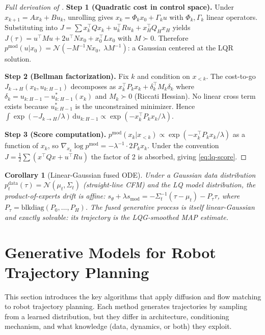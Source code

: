 \documentclass[11pt,letterpaper]{article}
\theoremstyle{plain}
\newtheorem{corollary}[theorem]{Corollary}
\theoremstyle{definition}
\theoremstyle{remark}
\newcommand{\dd}{\mathrm{d}}
\newcommand{\calN}{\mathcal{N}}
\newcommand{\grad}{\nabla}
\newcommand{\smodel}{s_{\mathrm{mod}}}
\begin{document}
\begin{advancedmath}
\begin{proof}[Full derivation of ]
\textbf{Step 1 (Quadratic cost in control space).}
Under $x_{k+1}=Ax_k+Bu_k$, unrolling gives $x_k=\Phi_kx_0+\Gamma_ku$
with $\Phi_k,\Gamma_k$ linear operators. Substituting into
$J=\sum x_k^\top Qx_k+u_k^\top Ru_k+x_H^\top Q_Hx_H$ yields
$J(\tau)=u^\top Mu+2u^\top Nx_0+x_0^\top Lx_0$ with
$M\succ 0$. Therefore
$p^{\mathrm{mod}}(u|x_0)=\calN(-M^{-1}Nx_0,\;\lambda M^{-1})$:
a Gaussian centered at the LQR solution.

\textbf{Step 2 (Bellman factorization).}
Fix $k$ and condition on $x_{<k}$. The cost-to-go
$J_{k\to H}(x_k,u_{k:H-1})$ decomposes as
$x_k^\top P_kx_k+\delta_k^\top M_k\delta_k$
where $\delta_k=u_{k:H-1}-u^*_{k:H-1}(x_k)$ and $M_k\succ 0$
(Riccati Hessian). No linear cross term exists because
$u^*_{k:H-1}$ is the unconstrained minimizer. Hence
$\int\exp(-J_{k\to H}/\lambda)\,\dd u_{k:H-1}
\propto\exp(-x_k^\top P_kx_k/\lambda)$.

\textbf{Step 3 (Score computation).}
$p^{\mathrm{mod}}(x_k|x_{<k})\propto\exp(-x_k^\top P_kx_k/\lambda)$
as a function of $x_k$, so
$\grad_{x_k}\log p^{\mathrm{mod}}=-\lambda^{-1}\cdot 2P_kx_k$.
Under the convention $J=\tfrac12\sum(x^\top Qx+u^\top Ru)$ the
factor of 2 is absorbed, giving \eqref{eq:lq-score}.
\end{proof}

\begin{corollary}[Linear-Gaussian fused ODE]
Under a Gaussian data distribution
$p_t^{\mathrm{data}}(\tau)=\calN(\mu_t,\Sigma_t)$ (straight-line CFM)
and the LQ model distribution, the product-of-experts drift is affine:
$s_\theta+\lambda\smodel=-\Sigma_t^{-1}(\tau-\mu_t)-P_\tau\tau$,
where $P_\tau=\mathrm{blkdiag}(P_0,\ldots,P_H)$.
The fused generative process is itself linear-Gaussian and exactly
solvable: its trajectory is the LQG-smoothed MAP estimate.
\end{corollary}
\end{advancedmath}

\section{Generative Models for Robot Trajectory Planning}\label{sec:robotplan}

This section introduces the key algorithms that apply diffusion and
flow matching to robot trajectory planning.  Each method generates
trajectories by sampling from a learned distribution, but they differ
in architecture, conditioning mechanism, and what knowledge (data,
dynamics, or both) they exploit.
\end{document}
